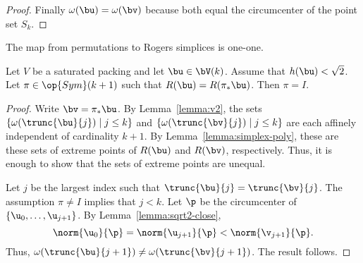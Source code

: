 \begin{proof}
Finally $\omega(\bu) = \omega(\bv)$ because both equal the circumcenter of the
point set $S_k$.
%
\end{proof}

The map from permutations to Rogers simplices is one-one.

\begin{lemma} 
  Let $V$ be a saturated packing and let $\bu\in
  \bV(k)$.  Assume that $h(\bu)<\sqrt2$.  Let $\pi\in\op{Sym}(k+1)$ such that
 $R(\bu)= R(\pi_*\bu)$.  Then $\pi= I$.
\end{lemma}

\begin{proof} 
Write $\bv = \pi_*\bu$.  By Lemma~\ref{lemma:v2}, the sets
$\{\omega(\trunc{\bu}{j})\mid j\le k\}$ and 
$\{\omega(\trunc{\bv}{j})\mid j\le k\}$ are each affinely independent of
cardinality $k+1$.  By Lemma~\ref{lemma:simplex-poly}, these are these sets
of extreme points of $R(\bu)$ and $R(\bv)$, respectively.  Thus, it is enough
to show that the sets of extreme points are unequal.

Let $j$ be the largest index such that $\trunc{\bu}{j}=\trunc{\bv}{j}$.
The assumption $\pi\ne I$ implies that $j<k$.  Let $\p$ be the circumcenter
of $\{\u_0,\ldots,\u_{j+1}\}$.  By Lemma~\ref{lemma:sqrt2-close}, 
\begin{displaymath} 
\norm{\u_0}{\p} = \norm{\u_{j+1}}{\p} < \norm{\v_{j+1}}{\p}.
\end{displaymath}
Thus, $\omega(\trunc{\bu}{j+1}) \ne \omega(\trunc{\bv}{j+1})$.  The result follows.
\end{proof}

